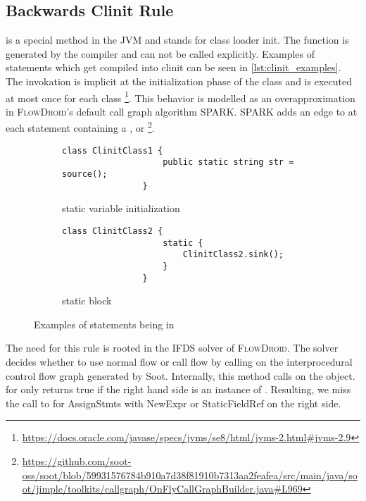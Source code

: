\documentclass[../draft.tex]{subfiles}
\begin{document}
    \subsection{Backwards Clinit Rule}\label{s:clinitrule}
     is a special method in the JVM and stands for class loader init. The function is generated by the compiler and can not be called explicitly. Examples of statements which get compiled into clinit can be seen in \autoref{lst:clinit_examples}. The invokation is implicit at the initialization phase of the class and is executed at most once for each class \footnote{\url{https://docs.oracle.com/javase/specs/jvms/se8/html/jvms-2.html\#jvms-2.9}}. 
    This behavior is modelled as an overapproximation in \textsc{FlowDroid}'s default call graph algorithm SPARK. SPARK adds an edge to  at each statement containing a ,  or  \footnote{\url{https://github.com/soot-oss/soot/blob/59931576784b910a7d38f81910b7313aa2feafea/src/main/java/soot/jimple/toolkits/callgraph/OnFlyCallGraphBuilder.java\#L969}}.
   
    \begin{figure}[ht]
        \centering
        \begin{subfigure}[b]{0.45\textwidth}
            \centering
            \begin{lstlisting}[gobble=16]
                class ClinitClass1 {
                    public static string str = source();
                }
            \end{lstlisting}
            \caption{static variable initialization}
            \label{lst:clinit_examples_a}
        \end{subfigure}
        \hfill
        \begin{subfigure}[b]{0.45\textwidth}
            \centering
            \begin{lstlisting}[gobble=16]
                class ClinitClass2 {
                    static {
                        ClinitClass2.sink();
                    }
                }
            \end{lstlisting}
            \caption{static block}
            \label{lst:clinit_examples_b}
        \end{subfigure}
        \caption{Examples of statements being in }
        \label{lst:clinit_examples}
    \end{figure}


    The need for this rule is rooted in the IFDS solver of \textsc{FlowDroid}. The solver decides whether to use normal flow or call flow by calling  on the interprocedural control flow graph generated by Soot. Internally, this method calls  on the  object.  for  only returns true if the right hand side is an instance of . Resulting, we miss the call to  for AssignStmts with NewExpr or StaticFieldRef on the right side.
\end{document}
